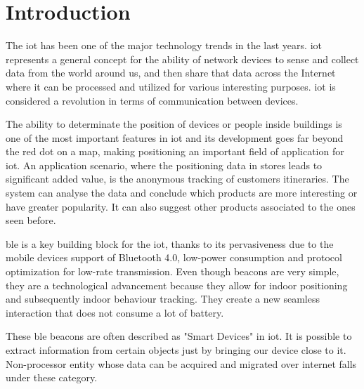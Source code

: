 \chapter{Introduction}
\label{chapter:introduction}

The \gls{iot} has been one of the major technology trends in the last years. \gls{iot} represents a general concept for the ability of network devices to sense and collect data from the world around us, and then share that data across the Internet where it can be processed and utilized for various interesting purposes. \gls{iot} is considered a revolution in terms of communication between devices.

The ability to determinate the position of devices or people inside buildings is one of the most important features in \gls{iot} and its development goes far beyond the red dot on a map, making positioning an important field of application for \gls{iot}. 
An application scenario, where the positioning data in stores leads to significant added value, is the anonymous tracking of customers itineraries. The system can analyse the data and conclude which products are more interesting or have greater popularity. It can also suggest other products associated to the ones seen before.

\gls{ble} is a key building block for the \gls{iot}, thanks to its pervasiveness due to the mobile devices support of Bluetooth 4.0, low-power consumption and protocol optimization for low-rate transmission.
Even though beacons are very simple, they are a technological advancement because they allow for indoor positioning and subsequently indoor behaviour tracking. They create a new seamless interaction that does not consume a lot of battery.

These \gls{ble} beacons are often described as "Smart Devices" in \gls{iot}. It is possible to extract information from certain objects just by bringing our device close to it. Non-processor entity whose data can be acquired and migrated over internet falls under these category. 

